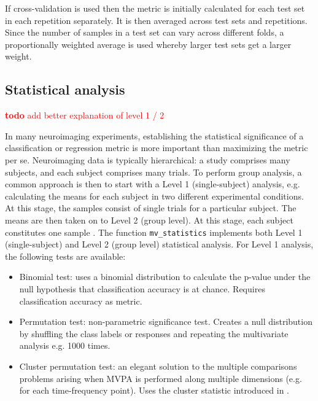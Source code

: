 \documentclass[utf8]{frontiersSCNS} %
\newcommand{\ttt}[1]{\texttt{#1}}
\newcommand{\todo}[1]{\textcolor{red}{\textbf{todo} #1}}
\begin{document}
If cross-validation is used then the metric is initially calculated for each test set in each repetition separately. It is then averaged across test sets and repetitions. Since the number of samples in a test set can vary across different folds, a proportionally weighted average is used whereby larger test sets get a larger weight.

\subsection{Statistical analysis}\label{sec:statistics}

\todo{add better explanation of level 1 / 2}

In many neuroimaging experiments, establishing the statistical significance of a classification or regression metric is more important than maximizing the metric per se. Neuroimaging data is typically hierarchical: a study comprises many subjects, and each subject comprises many trials. To perform group analysis, a common approach is then to start with a Level 1 (single-subject) analysis, e.g. calculating the means for each subject in two different experimental conditions. At this stage, the samples consist of single trials for a particular subject. The means are then taken on to Level 2 (group level). At this stage, each subject constitutes one sample  \citep{Mumford2007ModelingData}.
The function \ttt{mv\_statistics} implements both Level 1 (single-subject) and Level 2 (group level) statistical analysis. For Level 1 analysis, the following tests are available:

\begin{itemize}
    \item Binomial test: uses a binomial distribution to calculate the p-value under the null hypothesis that classification accuracy is at chance. Requires classification accuracy as metric.
    \item Permutation test: non-parametric significance test. Creates a null distribution by shuffling the class labels or responses and repeating the multivariate analysis e.g. 1000 times.
    \item Cluster permutation test: an elegant solution to the multiple comparisons problems arising when MVPA is performed along multiple dimensions (e.g. for each time-frequency point). Uses the cluster statistic introduced in
    \cite{Maris2007}.
\end{itemize}
\end{document}
